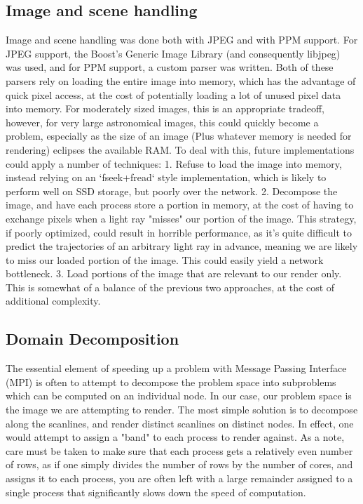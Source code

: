 \subsection{Image and scene handling}
Image and scene handling was done both with JPEG and with PPM support.
For JPEG support, the Boost's Generic Image Library \cite{schaling_boost} (and consequently libjpeg) was used, and for PPM support, a custom parser was written. Both of these parsers rely on loading the entire image into memory, which has the advantage of quick pixel access, at the cost of potentially loading a lot of unused pixel data into memory. For moderately sized images, this is an appropriate tradeoff, however, for very large astronomical images, this could quickly become a problem, especially as the size of an image (Plus whatever memory is needed for rendering) eclipses the available RAM. To deal with this, future implementations could apply a number of techniques:
1. Refuse to load the image into memory, instead relying on an `fseek+fread` style implementation, which is likely to perform well on SSD storage, but poorly over the network.
2. Decompose the image, and have each process store a portion in memory, at the cost of having to exchange pixels when a light ray "misses" our portion of the image. This strategy, if poorly optimized, could result in horrible performance, as it's quite difficult to predict the trajectories of an arbitrary light ray in advance, meaning we are likely to miss our loaded portion of the image. This could easily yield a network bottleneck.
3. Load portions of the image that are relevant to our render only. This is somewhat of a balance of the previous two approaches, at the cost of additional complexity. 


\subsection{Domain Decomposition}
The essential element of speeding up a problem with Message Passing Interface (MPI) \cite{mpi41} is often to attempt to decompose the problem space into subproblems which can be computed on an individual node. In our case, our problem space is the image we are attempting to render. The most simple solution is to decompose along the scanlines, and render distinct scanlines on distinct nodes. In effect, one would attempt to assign a "band" to each process to render against. As a note, care must be taken to make sure that each process gets a relatively even number of rows, as if one simply divides the number of rows by the number of cores, and assigns it to each process, you are often left with a large remainder assigned to a single process that significantly slows down the speed of computation.

